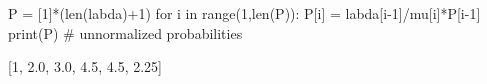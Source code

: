 
P = [1]*(len(labda)+1)
for i in range(1,len(P)):
    P[i] = labda[i-1]/mu[i]*P[i-1]
print(P) # unnormalized probabilities

[1, 2.0, 3.0, 4.5, 4.5, 2.25]

